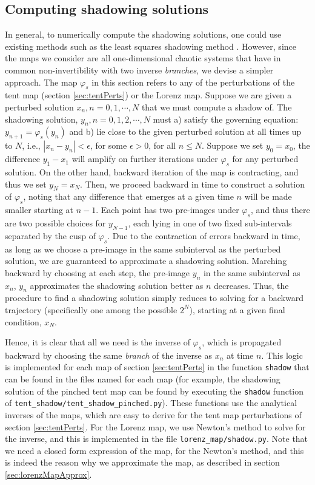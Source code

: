 \documentclass[preprint,12pt]{elsarticle}
\begin{document}
\subsection{Computing shadowing solutions}
\label{sec:computingShadowing}
		In general, to numerically compute the shadowing solutions, one could use existing methods such as 
		the least squares shadowing method \cite{qiqi-lss}. However, since the  maps we consider are all one-dimensional chaotic systems that have in common non-invertibility with two inverse \emph{branches}, we devise a simpler approach. The map $\varphi_s$ in this section refers to any of the perturbations of the tent map (section \ref{sec:tentPerts}) or the Lorenz map. Suppose we are given a perturbed solution $x_n, n =0,1,\cdots,N$ that we must compute a shadow of. 
The shadowing solution, $y_n, n=0,1,2,\cdots,N$ 
must a) satisfy the governing equation: $y_{n+1} = \varphi_s(y_n)$
and b) lie close to the given perturbed solution at all times up to 
$N$, i.e., $|x_n - y_n| < \epsilon$, for some $\epsilon > 0$, for all $n \leq N$. Suppose we set $y_0 = x_0$, the difference $y_1 - x_1$ will amplify on further iterations under $\varphi_s$ for any perturbed solution. On the other hand, backward iteration of the map is contracting, and thus we set $y_N = x_N$. Then, we proceed backward in time to 
construct a solution of $\varphi_s$, noting that any difference that emerges at a given time $n$ will be made smaller starting at $n-1$. Each point has two pre-images under $\varphi_s$, and thus there are two possible choices for $y_{N-1}$, each lying in one of two fixed sub-intervals separated by the cusp of $\varphi_s$. Due to the contraction of errors backward in time, as long as we choose a pre-image in the same subinterval as the perturbed solution, we are guaranteed to approximate a shadowing solution. Marching backward by choosing at each step, the pre-image $y_n$ in the same subinterval as $x_n$, $y_n$ approximates the shadowing solution better as $n$ decreases. Thus, the procedure to find a shadowing solution simply reduces to solving for a backward trajectory (specifically one among the possible $2^N$), starting at a given final condition,  $x_N$.
	
		Hence, it is clear that all we need is the inverse of 
		$\varphi_s$, which is propagated backward by choosing the same \emph{branch} of the inverse as $x_n$ at time $n$. This logic is implemented for each map of section \ref{sec:tentPerts} in the function \verb+shadow+ that can be found in the files named for each map (for example, the shadowing solution of the pinched tent map can be found by executing the \verb+shadow+ function of \verb+tent_shadow/tent_shadow_pinched.py+). These functions use the analytical inverses of the maps, which are easy to derive for the tent map perturbations of section \ref{sec:tentPerts}. For the Lorenz map, we use Newton's method to solve for the inverse, and this is implemented in the file \verb+lorenz_map/shadow.py+. Note that we need a closed form expression of the map, for the Newton's method, and this is indeed the reason why we approximate the map, as described in section \ref{sec:lorenzMapApprox}.
\end{document}
